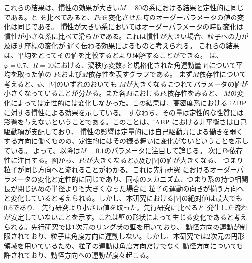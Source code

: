 \documentclass[/Users/ikedahajime/GitHub/reserch/master_report/thesis]{subfiles}
\begin{document}
これらの結果は、慣性の効果が大きい$M=80$の系における結果と定性的に同じである。と
を比べてみると、$Pe$を変化させた時のオーダーパラメータの値の変化は同じである。
慣性が大きい系においてはオーダーパラメータの時間変化は慣性が小さな系に比べて滑らかである。これは慣性が大きい場合、粒子への力が及ぼす座標の変化が
遅く伝わる効果によるものと考えられる。
これらの結果は、平均をとってその値を比較するとより理解することができる。
は、$\varphi=0.7、R=10$における、渦秩序変数$\psi$と規格化された角運動量$|V|$について平均を取った値の
$Pe$および$M$依存性を表すグラフである。
まず$M$依存性について考えると、$\psi、|V|$のいずれのおいても
$M$が大きくなるにつれてパラメータの値が小さくなっていることが分かる。また各$M$における$Pe$依存性をみると、
$M$の変化によっては定性的には変化しなかった。この結果は、高密度系における iABP に対する慣性による効果を示している。
すなわち、その量は定性的な性質には影響を与えないということである。このことは、iABP における非平衡さは自己駆動項が支配しており、
慣性の影響は定量的には自己駆動力による働きを弱くする方向に働くものの、定性的にはその振る舞いに変化がないということを示している。
よって、以降は$M=0.1$のパラメータに注目して論じる。%
次に$Pe$依存性に注目する。図から、$Pe$が大きくなると$\psi$及び$|V|$の値が大きくなる、
つまり粒子が同じ方向へと流れることがわかる。これは先行研究\cite{capriniCollectiveEffectsConfined2021}
におけるオーダーパラメータの変化と定性的に同じであり、同様のメカニズム、つまり系の持つ相関長が閉じ込めの半径よりも大きくなった場合に
粒子の運動の向きが揃う方向へと変化していると考えられる。しかし、本研究における$|V|$の絶対値は最大でも0.6であり、
先行研究\cite{capriniCollectiveEffectsConfined2021}より小さい値を取った。先行研究に比べると
発生した流れが安定していないことを示す。これは壁の形状によって生じる変化であると考えられる。先行研究では1次元のリング状の壁を用いており、
動径方向の運動が制限されており、粒子は角度方向に運動しない。しかし、本研究では2次元の円形領域を用いているため、粒子の運動は角度方向だけでなく
動径方向についても許されており、動径方向への運動が度々起こる。
\end{document}
